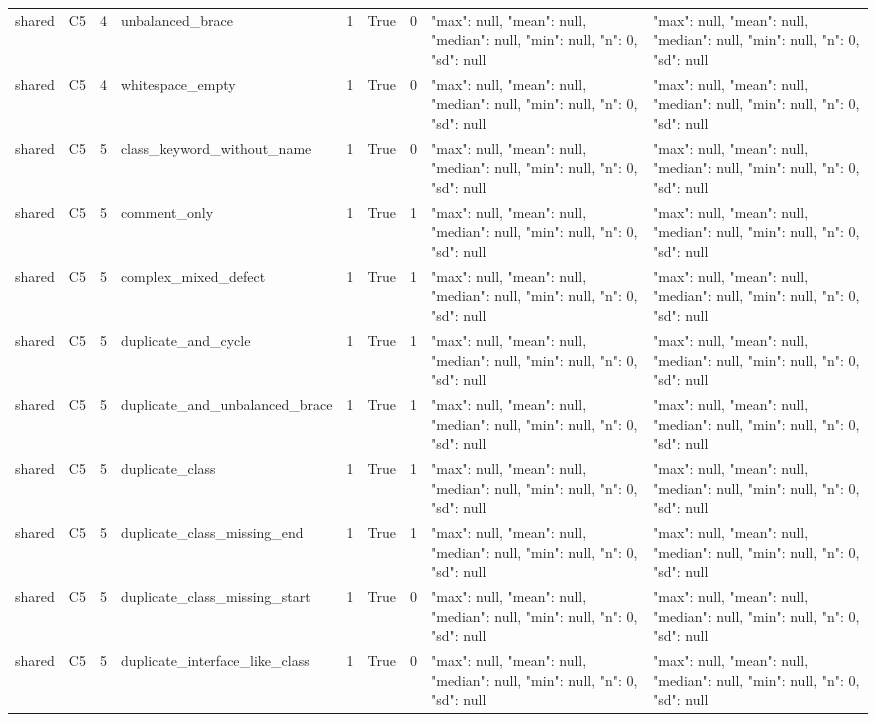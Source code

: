 \begin{tabular}{lllllllll}
shared & C5 & 4 & unbalanced\_brace & 1 & True & 0 & {"max": null, "mean": null, "median": null, "min": null, "n": 0, "sd": null} & {"max": null, "mean": null, "median": null, "min": null, "n": 0, "sd": null} \\
shared & C5 & 4 & whitespace\_empty & 1 & True & 0 & {"max": null, "mean": null, "median": null, "min": null, "n": 0, "sd": null} & {"max": null, "mean": null, "median": null, "min": null, "n": 0, "sd": null} \\
shared & C5 & 5 & class\_keyword\_without\_name & 1 & True & 0 & {"max": null, "mean": null, "median": null, "min": null, "n": 0, "sd": null} & {"max": null, "mean": null, "median": null, "min": null, "n": 0, "sd": null} \\
shared & C5 & 5 & comment\_only & 1 & True & 1 & {"max": null, "mean": null, "median": null, "min": null, "n": 0, "sd": null} & {"max": null, "mean": null, "median": null, "min": null, "n": 0, "sd": null} \\
shared & C5 & 5 & complex\_mixed\_defect & 1 & True & 1 & {"max": null, "mean": null, "median": null, "min": null, "n": 0, "sd": null} & {"max": null, "mean": null, "median": null, "min": null, "n": 0, "sd": null} \\
shared & C5 & 5 & duplicate\_and\_cycle & 1 & True & 1 & {"max": null, "mean": null, "median": null, "min": null, "n": 0, "sd": null} & {"max": null, "mean": null, "median": null, "min": null, "n": 0, "sd": null} \\
shared & C5 & 5 & duplicate\_and\_unbalanced\_brace & 1 & True & 1 & {"max": null, "mean": null, "median": null, "min": null, "n": 0, "sd": null} & {"max": null, "mean": null, "median": null, "min": null, "n": 0, "sd": null} \\
shared & C5 & 5 & duplicate\_class & 1 & True & 1 & {"max": null, "mean": null, "median": null, "min": null, "n": 0, "sd": null} & {"max": null, "mean": null, "median": null, "min": null, "n": 0, "sd": null} \\
shared & C5 & 5 & duplicate\_class\_missing\_end & 1 & True & 1 & {"max": null, "mean": null, "median": null, "min": null, "n": 0, "sd": null} & {"max": null, "mean": null, "median": null, "min": null, "n": 0, "sd": null} \\
shared & C5 & 5 & duplicate\_class\_missing\_start & 1 & True & 0 & {"max": null, "mean": null, "median": null, "min": null, "n": 0, "sd": null} & {"max": null, "mean": null, "median": null, "min": null, "n": 0, "sd": null} \\
shared & C5 & 5 & duplicate\_interface\_like\_class & 1 & True & 0 & {"max": null, "mean": null, "median": null, "min": null, "n": 0, "sd": null} & {"max": null, "mean": null, "median": null, "min": null, "n": 0, "sd": null} \\

\end{tabular}
